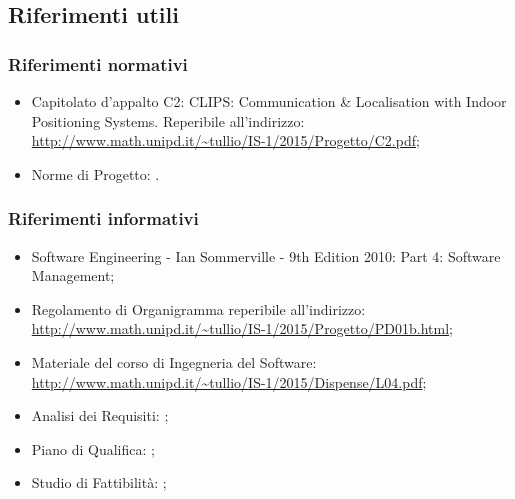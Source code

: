 \documentclass[../PianoProgetto.tex]{subfiles}
\begin{document}
	\subsection{Riferimenti utili}

		\subsubsection{Riferimenti normativi}
		\begin{itemize}
		\item Capitolato d’appalto C2: CLIPS: Communication \& Localisation with Indoor Positioning Systems. Reperibile all’indirizzo: \url{http://www.math.unipd.it/~tullio/IS-1/2015/Progetto/C2.pdf};
		\item Norme di Progetto: \normediprogettov.
		\end{itemize}

		\subsubsection{Riferimenti informativi}
		\begin{itemize}
		\item Software Engineering - Ian Sommerville - 9th Edition 2010:  Part 4: Software Management;
		\item Regolamento di Organigramma reperibile all’indirizzo: \url{http://www.math.unipd.it/~tullio/IS-1/2015/Progetto/PD01b.html};
		\item Materiale del corso di Ingegneria del Software: \url{http://www.math.unipd.it/~tullio/IS-1/2015/Dispense/L04.pdf};
		\item Analisi dei Requisiti: \analisideirequisitiv ;
		\item Piano di Qualifica: \pianodiqualificav ;
		\item Studio di Fattibilità: \studiodifattibilitav ;
		\end{itemize}
			
\end{document}
